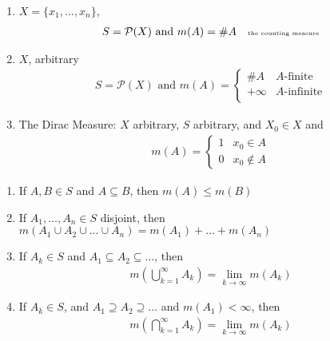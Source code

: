 \begin{example}
	\begin{enumerate}
		\item $X = \{x_1, \ldots, x_n\}$,
			\begin{align*}
				S = \mathcal{P}(X) \text{ and } m(A) = \#A \quad \text{\tiny the counting measure}
			\end{align*}
		\item $X$, arbitrary
			\begin{align*}
				S = \mathcal{P}(X) \text{ and } m(A) =
				\begin{cases}
					\#A & A\text{-finite} \\
					+\infty & A\text{-infinite} \\
				\end{cases}
			\end{align*}

		\item The Dirac Measure:
			$X$ arbitrary, $S$ arbitrary, and $X_0 \in X$ and
			\begin{align*}
				m(A) =
				\begin{cases}
					1 & x_0 \in A \\
					0 & x_0 \notin A
				\end{cases}
			\end{align*}
	\end{enumerate}
\end{example}


\begin{definition}
	\begin{enumerate}
		\item If $A,B \in S$  and $A \subseteq B$, then $m(A) \leq m(B)$
		\item If  $A_1, \ldots, A_n \in S$ disjoint, then
			$m(A_1 \cup A_2 \cup \ldots \cup A_n) = m(A_1) + \ldots + m(A_n)$
		\item If  $A_k \in S$ and $A_1 \subseteq A_2 \subseteq \ldots$, then
			\begin{align*}
				m(\bigcup_{k=1}^{\infty} A_k ) = \lim_{k \to \infty} m(A_k)
			\end{align*}
		\item If $A_k \in S$, and $A_1 \supseteq A_2 \supseteq \ldots$ and $m(A_1) < \infty$,
			then
			 \begin{align*}
				m(\bigcap_{k=1}^{\infty} A_k) = \lim_{k \to \infty}  m(A_k)
			\end{align*}
	\end{enumerate}
\end{definition}


